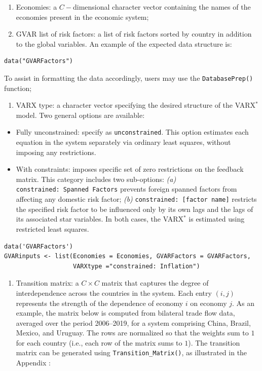 \begin{enumerate}
\def\labelenumi{\arabic{enumi}.}
\item
  Economies: a \(C-\)dimensional character vector containing the names of the economies present in the economic system;
\item
  GVAR list of risk factors: a list of risk factors sorted by country in addition to the global variables. An example of the expected data structure is:
\end{enumerate}

\begin{verbatim}
data("GVARFactors")
\end{verbatim}

To assist in formatting the data accordingly, users may use the \texttt{DatabasePrep()} function;

\begin{enumerate}
\def\labelenumi{\arabic{enumi}.}
\setcounter{enumi}{2}
\tightlist
\item
  VARX type: a character vector specifying the desired structure of the VARX\(^{*}\) model. Two general options are available:
\end{enumerate}

\begin{itemize}
\item
  Fully unconstrained: specify as \texttt{unconstrained}. This option estimates each equation in the system separately via ordinary least squares, without imposing any restrictions.
\item
  With constraints: imposes specific set of zero restrictions on the feedback matrix. This category includes two sub-options:
  \emph{(a)} \texttt{constrained:\ Spanned\ Factors} prevents foreign spanned factors from affecting any domestic risk factor;
  \emph{(b)} \texttt{constrained:\ {[}factor\ name{]}} restricts the specified risk factor to be influenced only by its own lags and the lags of its associated star variables. In both cases, the VARX\(^{*}\) is estimated using restricted least squares.
\end{itemize}

\begin{verbatim}
data('GVARFactors')
GVARinputs <- list(Economies = Economies, GVARFactors = GVARFactors,
                   VARXtype ="constrained: Inflation")
\end{verbatim}

\begin{enumerate}
\def\labelenumi{\arabic{enumi}.}
\setcounter{enumi}{3}
\tightlist
\item
  Transition matrix: a \(C \times C\) matrix that captures the degree of interdependence across the countries in the system. Each entry \((i,j)\) represents the strength of the dependence of economy \(i\) on economy \(j\). As an example, the matrix below is computed from bilateral trade flow data, averaged over the period 2006--2019, for a system comprising China, Brazil, Mexico, and Uruguay. The rows are normalized so that the weights sum to \(1\) for each country (i.e., each row of the matrix sums to \(1\)).
  The transition matrix can be generated using \texttt{Transition\_Matrix()}, as illustrated in the Appendix :
\end{enumerate}

